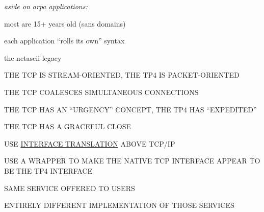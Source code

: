 \begin{note}\em
aside on arpa applications:

\begin{nrtc}
\item	most are 15+ years old (sans domains)
\item	each application ``rolls its own'' syntax
\item	the netascii legacy
\end{nrtc}  
\end{note}


\begin{bwslide}
\vskip-0.5in
\end	{bwslide}


\begin{bwslide}

\begin{nrtc}
\item	THE TCP IS STREAM-ORIENTED, THE TP4 IS PACKET-ORIENTED

\item	THE TCP COALESCES SIMULTANEOUS CONNECTIONS

\item	THE TCP HAS AN ``URGENCY'' CONCEPT, THE TP4 HAS ``EXPEDITED''

\item	THE TCP HAS A GRACEFUL CLOSE
\end{nrtc}
\end{bwslide}


\begin{bwslide}

\begin{nrtc}
\item	USE \underline{INTERFACE TRANSLATION} ABOVE TCP/IP
    \begin{nrtc}
    \item	USE A WRAPPER TO MAKE THE NATIVE TCP INTERFACE APPEAR TO BE
		THE TP4 INTERFACE

    \item	SAME SERVICE OFFERED TO USERS

    \item	ENTIRELY DIFFERENT IMPLEMENTATION OF THOSE SERVICES
    \end{nrtc}
\end{nrtc}
\end{bwslide}


\begin{bwslide}

\end{bwslide}


